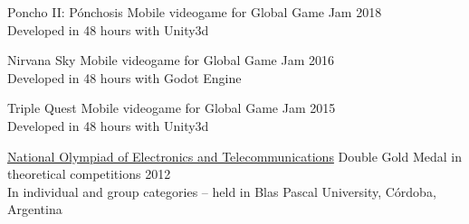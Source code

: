 \documentclass[10pt,a4paper]{article}
\begin{document}
\pagebreak

\spacedhrule{0.8em}{-0.4em} %


\vspace{0.2em}
\headedsection
    { Poncho II: Pónchosis \href{https://globalgamejam.org/2018/games/poncho-ii-p\%C3\%B3nchosis}{\ExternalLink} }
    { \textsc{} }{
    \headedsubsection
        { Mobile videogame for Global Game Jam }
        { 2018 }
        { \\ Developed in 48 hours with Unity3d }
}

\vspace{0.2em}
\headedsection
    { Nirvana Sky \href{http://globalgamejam.org/2016/games/nirvana-sky}{\ExternalLink} }
    { \textsc{} }{
    \headedsubsection
        { Mobile videogame for Global Game Jam }
        { 2016 }
        { \\ Developed in 48 hours with Godot Engine }
}

\vspace{0.2em}
\headedsection
    { Triple Quest \href{http://globalgamejam.org/2015/games/triple-quest}{\ExternalLink} }
    { \textsc{} }{
    \headedsubsection
        { Mobile videogame for Global Game Jam }
        { 2015 }
        { \\ Developed in 48 hours with Unity3d }
}

\vspace{0.2em}
\headedsection
    { \href{}{National Olympiad of Electronics and Telecommunications} }
    { \textsc{} }{
    \headedsubsection
        { Double Gold Medal in theoretical competitions }
        { 2012 }
        { \\ In individual and group categories -- held in Blas Pascal University, Córdoba, Argentina }
}
\end{document}

